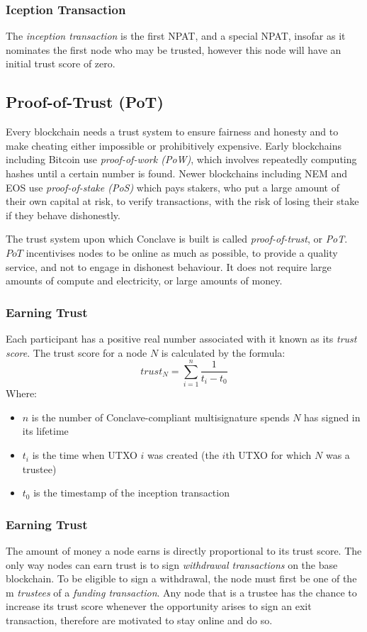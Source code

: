 \documentclass{report}
\begin{document}
			
			\subsubsection{Iception Transaction}
			
			The \textit{inception transaction} is the first NPAT, and a special NPAT, insofar as it nominates the first node who may be trusted, however this node will have an initial trust score of zero.
			
		\subsection{Proof-of-Trust (PoT)}
		Every blockchain needs a trust system to ensure fairness and honesty and to make cheating either impossible or prohibitively expensive. Early blockchains including Bitcoin use \textit{proof-of-work (PoW)}, which involves repeatedly computing hashes until a certain number is found. Newer blockchains including NEM and EOS use \textit{proof-of-stake (PoS)} which pays stakers, who put a large amount of their own capital at risk, to verify transactions, with the risk of losing their stake if they behave dishonestly. 

The trust system upon which Conclave is built is called \textit{proof-of-trust}, or \textit{PoT}. $PoT$ incentivises nodes to be online as much as possible, to provide a quality service, and not to engage in dishonest behaviour. It does not require large amounts of compute and electricity, or large amounts of money.
		\subsubsection{Earning Trust}
		Each participant has a positive real number associated with it known as its \textit{trust score}.  The trust score for a node $N$ is calculated by the formula:
		\[trust_N = \sum_{i=1}^n\frac{1}{t_i - t_0}\]
		Where:
		\begin{itemize}
			\item $n$ is the number of Conclave-compliant multisignature spends $N$ has signed in its lifetime
			\item $t_i$ is the time when UTXO $i$ was created (the $i$th UTXO for which $N$ was a trustee)
			\item $t_0$ is the timestamp of the inception transaction 
		\end{itemize}
		
		
		
		\subsubsection{Earning Trust} 
		The amount of money a node earns is directly proportional to its trust score. The only way nodes can earn trust is to sign \textit{withdrawal transactions} on the base blockchain. To be eligible to sign a withdrawal, the node must first be one of the m \textit{trustees} of a \textit{funding transaction}. Any node that is a trustee has the chance to increase its trust score whenever the opportunity arises to sign an exit transaction, therefore are motivated to stay online and do so.
\end{document}
